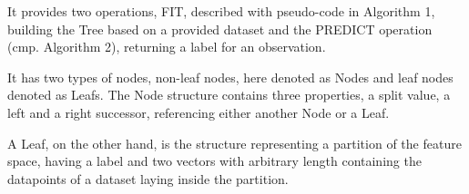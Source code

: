 \documentclass[journal]{IEEEtran}
\begin{document}
It provides two operations, FIT, described with pseudo-code
in Algorithm 1, building the Tree based on a provided
dataset and the PREDICT operation (cmp. Algorithm 2),
returning a label for an observation.

It has two types of nodes, non-leaf nodes, here denoted as
Nodes and leaf nodes denoted as Leafs. The Node structure
contains three properties, a split value, a left and a
right successor, referencing either another Node or a
Leaf.

A Leaf, on the other hand, is the structure
representing a partition of the feature space, having a
label and two vectors with arbitrary
length containing the datapoints of a dataset laying inside
the partition.

%




%
%
%






\end{document}
